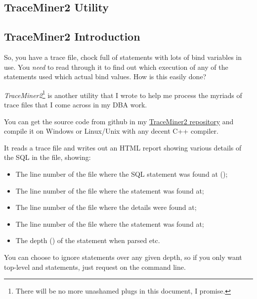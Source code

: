 \begin{appendix}
\chapter{TraceMiner2 Utility}
\label{traceminer2-utility}

\section*{TraceMiner2 Introduction}\label{traceminer2-introduction}

So, you have a trace file, chock full of statements with lots of bind
variables in use. You \emph{need} to read through it to find out which
execution of any of the statements used which actual bind values. How is
this easily done?

\emph{TraceMiner2}\footnote{There will be no more unashamed plugs in this
  document, I promise.} is another utility that I wrote to help me
process the myriads of trace files that I come across in my DBA work.

You can get the source code from github in my 
\href{https://github.com/NormanDunbar/TraceMiner2}{TraceMiner2 repository} and compile it
on Windows or Linux/Unix with any decent C++ compiler.

It reads a trace file and writes out an HTML report showing various
details of the SQL in the file, showing:

\begin{itemize}
\tightlist
\item
  The line number of the file where the SQL statement was found at
  ();
\item
  The line number of the file where  the  statement was found at;
\item
  The line number of the file where  the  details were found at;
\item
  The line number of the file where  the  statement was found at;
\item
  The depth () of the statement when parsed etc.
\end{itemize}

You can choose to ignore statements over any given depth, so if you only
want top-level and  statements, just request  on the
command line. 


\end{appendix}
